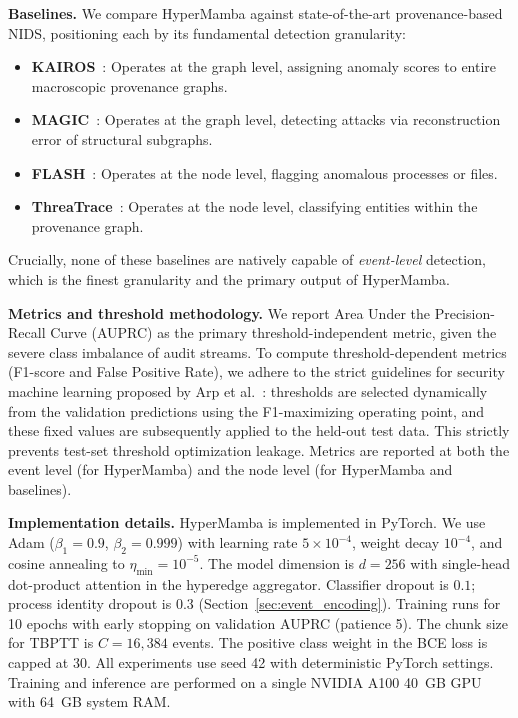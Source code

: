 \documentclass[letterpaper,twocolumn,10pt]{article}
\begin{document}


\textbf{Baselines.} We compare HyperMamba against state-of-the-art provenance-based NIDS, positioning each by its fundamental detection granularity:
\begin{itemize}
    \item \textbf{KAIROS}~\cite{cheng2024kairos}: Operates at the graph level, assigning anomaly scores to entire macroscopic provenance graphs.
    \item \textbf{MAGIC}~\cite{jia2024magic}: Operates at the graph level, detecting attacks via reconstruction error of structural subgraphs.
    \item \textbf{FLASH}~\cite{rehman2024flash}: Operates at the node level, flagging anomalous processes or files.
    \item \textbf{ThreaTrace}~\cite{Wang2021THREATRACEDA}: Operates at the node level, classifying entities within the provenance graph.
\end{itemize}
Crucially, none of these baselines are natively capable of \emph{event-level} detection, which is the finest granularity and the primary output of HyperMamba.

\textbf{Metrics and threshold methodology.} We report Area Under the Precision-Recall Curve (AUPRC) as the primary threshold-independent metric, given the severe class imbalance of audit streams. To compute threshold-dependent metrics (F1-score and False Positive Rate), we adhere to the strict guidelines for security machine learning proposed by Arp et al.~\cite{arp2022dos}: thresholds are selected dynamically from the validation predictions using the F1-maximizing operating point, and these fixed values are subsequently applied to the held-out test data. This strictly prevents test-set threshold optimization leakage. Metrics are reported at both the event level (for HyperMamba) and the node level (for HyperMamba and baselines).

\textbf{Implementation details.} HyperMamba is implemented in PyTorch. We use Adam ($\beta_1\!=\!0.9$, $\beta_2\!=\!0.999$) with learning rate $5 \times 10^{-4}$, weight decay $10^{-4}$, and cosine annealing to $\eta_{\min}=10^{-5}$. The model dimension is $d=256$ with single-head dot-product attention in the hyperedge aggregator. Classifier dropout is $0.1$; process identity dropout is $0.3$ (Section~\ref{sec:event_encoding}). Training runs for 10 epochs with early stopping on validation AUPRC (patience 5). The chunk size for TBPTT is $C=16{,}384$ events. The positive class weight in the BCE loss is capped at 30. All experiments use seed 42 with deterministic PyTorch settings. Training and inference are performed on a single NVIDIA A100 40~GB GPU with 64~GB system RAM.
\end{document}
